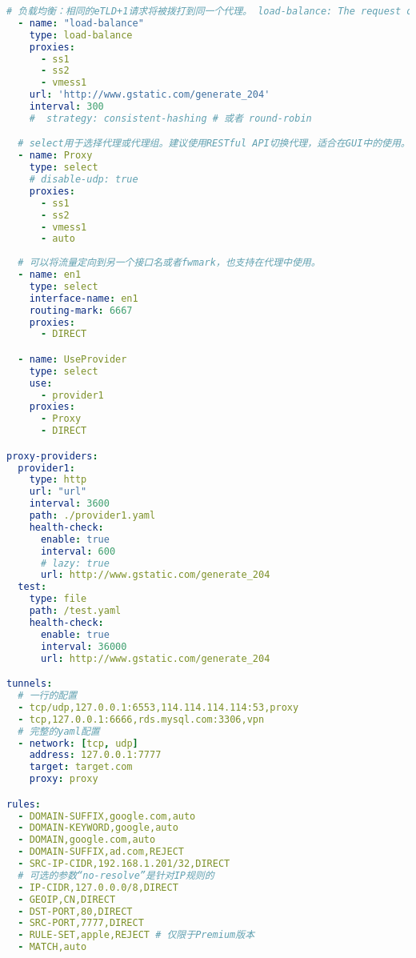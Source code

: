 \begin{lstlisting}[breaklines=true,language=yaml,style=yaml]
  # 负载均衡：相同的eTLD+1请求将被拨打到同一个代理。 load-balance: The request of the same eTLD+1 will be dial to the same proxy.
  - name: "load-balance"
    type: load-balance
    proxies:
      - ss1
      - ss2
      - vmess1
    url: 'http://www.gstatic.com/generate_204'
    interval: 300
    #  strategy: consistent-hashing # 或者 round-robin

  # select用于选择代理或代理组。建议使用RESTful API切换代理，适合在GUI中的使用。 
  - name: Proxy
    type: select
    # disable-udp: true
    proxies:
      - ss1
      - ss2
      - vmess1
      - auto
 
  # 可以将流量定向到另一个接口名或者fwmark，也支持在代理中使用。
  - name: en1
    type: select
    interface-name: en1
    routing-mark: 6667
    proxies:
      - DIRECT 

  - name: UseProvider
    type: select
    use:
      - provider1
    proxies:
      - Proxy
      - DIRECT

proxy-providers:
  provider1:
    type: http
    url: "url"
    interval: 3600
    path: ./provider1.yaml
    health-check:
      enable: true
      interval: 600
      # lazy: true
      url: http://www.gstatic.com/generate_204
  test:
    type: file
    path: /test.yaml
    health-check:
      enable: true
      interval: 36000
      url: http://www.gstatic.com/generate_204

tunnels:
  # 一行的配置
  - tcp/udp,127.0.0.1:6553,114.114.114.114:53,proxy
  - tcp,127.0.0.1:6666,rds.mysql.com:3306,vpn
  # 完整的yaml配置
  - network: [tcp, udp]
    address: 127.0.0.1:7777
    target: target.com
    proxy: proxy

rules:
  - DOMAIN-SUFFIX,google.com,auto
  - DOMAIN-KEYWORD,google,auto
  - DOMAIN,google.com,auto
  - DOMAIN-SUFFIX,ad.com,REJECT
  - SRC-IP-CIDR,192.168.1.201/32,DIRECT
  # 可选的参数“no-resolve”是针对IP规则的
  - IP-CIDR,127.0.0.0/8,DIRECT
  - GEOIP,CN,DIRECT
  - DST-PORT,80,DIRECT
  - SRC-PORT,7777,DIRECT
  - RULE-SET,apple,REJECT # 仅限于Premium版本
  - MATCH,auto
\end{lstlisting}
